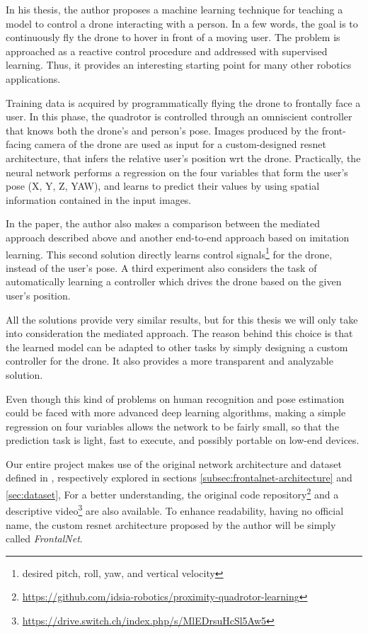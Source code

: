 \medskip

In his thesis, the author proposes a machine learning technique for teaching a model to control a drone interacting with a person. In a few words, the goal is to continuously fly the drone to hover in front of a moving user. The problem is approached as a reactive control procedure and addressed with supervised learning. Thus, it provides an interesting starting point for many other robotics applications.

Training data is acquired by programmatically flying the drone to frontally face a user. In this phase, the quadrotor is controlled through an omniscient controller that knows both the drone's and person's pose. Images produced by the front-facing camera of the drone are used as input for a custom-designed \gls{resnet} architecture, that infers the relative user's position \gls{wrt} the drone. Practically, the neural network performs a regression on the four variables that form the user's pose (X, Y, Z, YAW), and learns to predict their values by using spatial information contained in the input images.

In the paper, the author also makes a comparison between the mediated approach described above and another end-to-end approach based on imitation learning. This second solution directly learns control signals\footnote{desired pitch, roll, yaw, and vertical velocity} for the drone, instead of the user's pose. A third experiment also considers the task of automatically learning a controller which drives the drone based on the given user's position.

All the solutions provide very similar results, but for this thesis we will only take into consideration the mediated approach. The reason behind this choice is that the learned model can be adapted to other tasks by simply designing a custom controller for the drone. It also provides a more transparent and analyzable solution.

\medskip

Even though this kind of problems on human recognition and pose estimation could be faced with more advanced deep learning algorithms, making a simple regression on four variables allows the network to be fairly small, so that the prediction task is light, fast to execute, and possibly portable on low-end devices.

Our entire project makes use of the original network architecture and dataset defined in \cite{mantegazza2019visionbased}, respectively explored in sections \ref{subsec:frontalnet-architecture} and \ref{sec:dataset}, For a better understanding, the original code repository\footnote{\url{https://github.com/idsia-robotics/proximity-quadrotor-learning}} and a descriptive video\footnote{\url{https://drive.switch.ch/index.php/s/MlEDrsuHcSl5Aw5}} are also available. 
To enhance readability, having no official name, the custom \gls{resnet} architecture proposed by the author will be simply called \textit{FrontalNet}.


